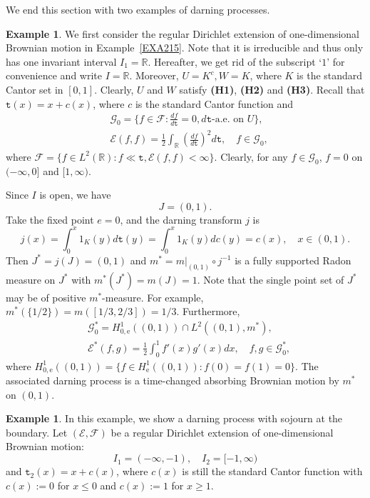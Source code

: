 \documentclass[a4paper]{amsart}
\theoremstyle{definition}
\newtheorem{example}[theorem]{Example}
\theoremstyle{remark}
\numberwithin{equation}{section}
\begin{document}
{We end this section with two examples of darning processes.

\begin{example}
We first consider the regular Dirichlet extension of one-dimensional Brownian motion in Example~\ref{EXA215}. Note that it is irreducible and thus only has one invariant interval $I_1=\mathbb{R}$. Hereafter, we get rid of the subscript `$1$' for convenience and write $I=\mathbb{R}$. Moreover, $U=K^c, W=K$, where $K$ is the standard Cantor set in $[0,1]$.  Clearly, $U$ and $W$ satisfy \textbf{(H1)}, \textbf{(H2)} and \textbf{(H3)}. Recall that ${{\mathtt{t}}}(x)=x+c(x)$, where $c$ is the standard Cantor function and
\[
\begin{aligned}
&\mathcal{G}_0=\{f\in {{\mathcal{F}}}: \frac{df}{d{{\mathtt{t}}}}=0, d{{\mathtt{t}}}\text{-a.e. on }U\},\\
&{{\mathcal{E}}}(f,f)=\frac{1}{2}\int_{\mathbb{R}}\left(\frac{df}{d{{\mathtt{t}}}}\right)^2d{{\mathtt{t}}},\quad f\in \mathcal{G}_0,
\end{aligned}
\]
where ${{\mathcal{F}}}=\{f\in L^2(\mathbb{R}): f\ll {{\mathtt{t}}}, {{\mathcal{E}}}(f,f)<\infty\}$. Clearly, for any $f\in \mathcal{G}_0$, $f=0$ on $(-\infty, 0]$ and $[1,\infty)$.

Since $I$ is open, we have
\[
	J=(0, 1).
\]
Take the fixed point $e=0$, and the darning transform $j$ is
\[
	j(x)=\int_0^x1_K(y)d{{\mathtt{t}}}(y)=\int_0^x1_K(y)dc(y)=c(x),\quad x\in (0,1).
\]
Then $J^*=j(J)=(0,1)$ and $m^*=m|_{(0,1)}\circ j^{-1}$ is a fully supported Radon measure on $J^*$ with $m^*(J^*)=m(J)=1$. Note that the single point set of $J^*$ may be of positive $m^*$-measure. For example, $m^*(\{1/2\})=m([1/3, 2/3])=1/3$.  Furthermore,
\[
\begin{aligned}
&\mathcal{G}^*_0=H^1_{0,\mathrm{e}}((0,1))\cap L^2((0,1), m^*),\\
&{{\mathcal{E}}}^*(f,g)=\frac{1}{2}\int_0^1 f'(x)g'(x)dx,\quad f,g\in \mathcal{G}^*_0,
\end{aligned}
\]
where $H^1_{0,\mathrm{e}}((0,1))=\{f\in H^1_\mathrm{e}((0,1)): f(0)=f(1)=0  \}$.
The associated darning process is a time-changed absorbing Brownian motion by $m^*$ on $(0,1)$.
\end{example}

\begin{example}
In this example, we show a darning process with sojourn at the boundary. Let $({{\mathcal{E}}},{{\mathcal{F}}})$ be a regular Dirichlet extension of one-dimensional Brownian motion:
\[
	I_1=(-\infty, -1),\quad I_2=[-1, \infty)
\]
and ${{\mathtt{t}}}_2(x)=x+c(x)$, where $c(x)$ is still the standard Cantor function with $c(x):=0$ for $x\leq 0$ and $c(x):=1$ for $x\geq 1$.


\end{example}}
\end{document}
